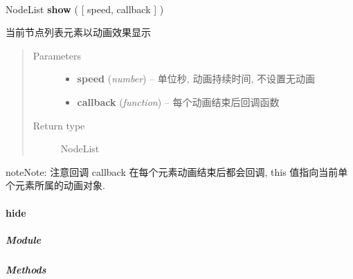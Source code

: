 \documentclass[letterpaper,10pt,english]{sphinxmanual}
\begin{document}
\begin{fulllineitems}
\label{api/core/node/show:Node.show}~
\begin{DUlineblock}{0em}
\item[] NodeList \textbf{show} ( {[} speed, callback {]} )
\item[] 当前节点列表元素以动画效果显示
\end{DUlineblock}
\begin{quote}\begin{description}
\item[{Parameters}] \leavevmode\begin{itemize}
\item {}
\textbf{speed} (\emph{number}) -- 单位秒, 动画持续时间, 不设置无动画

\item {}
\textbf{callback} (\emph{function}) -- 每个动画结束后回调函数

\end{itemize}

\item[{Return type}] \leavevmode
NodeList

\end{description}\end{quote}

\begin{notice}{note}{Note:}
注意回调 callback 在每个元素动画结束后都会回调,  this 值指向当前单个元素所属的动画对象.
\end{notice}

\end{fulllineitems}



\paragraph{hide}
\label{api/core/node/hide:hide}\label{api/core/node/hide::doc}

\subparagraph{Module}
\label{api/core/node/hide:module}\begin{quote}

{\hyperref[api/core/node/index:module-Node]{}}
\end{quote}


\subparagraph{Methods}
\label{api/core/node/hide:methods}
\end{document}
